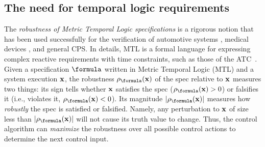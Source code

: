 \subsection{The need for temporal logic requirements}
\label{sec:morari}
The \textit{robustness of Metric Temporal Logic specifications} \cite{Fainekos2006_TLVerifSimu,Donze2010} is a rigorous notion that has been used successfully for the verification of automotive systems \cite{Fainekos12_Automotive,Dreossi15_RRTFalsification}, medical devices \cite{SankaranarayananF2012cmsb}, and general CPS.
In details, MTL is a formal language for expressing complex reactive requirements with time constraints, such as those of the ATC~\cite{Koymans90}.
Given a specification $\formula$ written in Metric Temporal Logic (MTL) and a system execution $\mathbf{x}$, the robustness $\robf(\sstraj)$ of the spec relative to $\mathbf{x}$ measures two things:
its sign tells whether $\mathbf{x}$ satisfies the spec ($\robf(\sstraj) > 0$) or falsifies it (i.e., violates it, $\robf(\sstraj) <0$).
Its magnitude $|\robf(\sstraj)|$ measures how \textit{robustly} the spec is satisfied or falsified.
Namely, any perturbation to $\mathbf{x}$ of size less than $|\robf(\sstraj)|$ will not cause its truth value to change.
Thus, the control algorithm can \textit{maximize} the robustness over all possible control actions to determine the next control input.